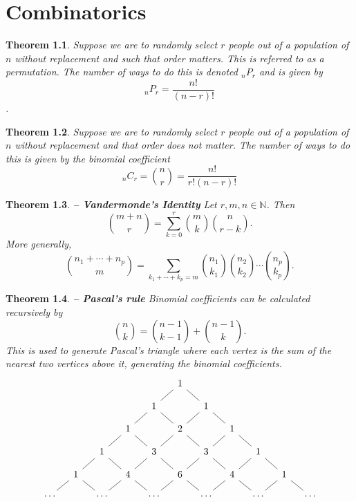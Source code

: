 \documentclass[1pt]{report}
\newtheorem{thm}{Theorem}[chapter]
\newcommand{\N}{\mathbb{N}}
\newcommand{\<}{\langle}
\renewcommand{\>}{\rangle}
\begin{document}
\chapter{Combinatorics}
\begin{thm}\label{thm:permutation}
Suppose we are to randomly select $r$ people out of a population of $n$ without replacement and such that order matters. This is referred to as a \emph{permutation}. The number of ways to do this is denoted $_nP_r$ and is given by 
$$_nP_r = \frac{n!}{(n-r)!}$$.
\end{thm}
\begin{thm}\label{thm:choose}
Suppose we are to randomly select $r$ people out of a population of $n$ without replacement and that order does not matter. The number of ways to do this is given by the binomial coefficient
$$_nC_r = \binom{n}{r} = \frac{n!}{r!(n-r)!}$$
\end{thm}
\begin{thm}\textbf{ -- Vandermonde's Identity}
Let $r,m,n \in \N$. Then
$$\binom{m+n}{r} = \sum\limits_{k=0}^r \binom{m}{k}\binom{n}{r-k}.$$
More generally,
$$\binom{n_1 + \cdots + n_p}{m} = \sum\limits_{k_1 + \cdots + k_p = m} \binom{n_1}{k_1}\binom{n_2}{k_2} \cdots \binom{n_p}{k_p}.$$
\end{thm}
\begin{thm}\textbf{ -- Pascal's rule}
Binomial coefficients can be calculated recursively by
$$\binom{n}{k} = \binom{n-1}{k-1} + \binom{n-1}{k}.$$
This is used to generate \emph{Pascal's triangle} where each vertex is the sum of the nearest two vertices above it, generating the binomial coefficients.
$$\begin{tikzcd}[column sep = 10pt, row sep = 10pt]
&&& &  &1\arrow[dr,dash]\arrow[dl,dash] & & &&& \\
&&& &1\arrow[dr,dash]\arrow[dl,dash] & &1\arrow[dr,dash]\arrow[dl,dash] & &&& \\
&&&1\arrow[dr,dash]\arrow[dl,dash] & &2\arrow[dr,dash]\arrow[dl,dash] & &1\arrow[dr,dash]\arrow[dl,dash] &&& \\
&&1\arrow[dr,dash]\arrow[dl,dash]& &3\arrow[dr,dash]\arrow[dl,dash] & &3\arrow[dr,dash]\arrow[dl,dash] & &1\arrow[dr,dash]\arrow[dl,dash]&& \\
&1\arrow[dr,dash]\arrow[dl,dash] & &4\arrow[dr,dash]\arrow[dl,dash] && 6\arrow[dr,dash]\arrow[dl,dash] && 4\arrow[dr,dash]\arrow[dl,dash] && 1\arrow[dr,dash]\arrow[dl,dash] &\\
\cdots && \cdots && \cdots && \cdots && \cdots && \cdots\\
\end{tikzcd}$$ 
\end{thm}
\end{document}
